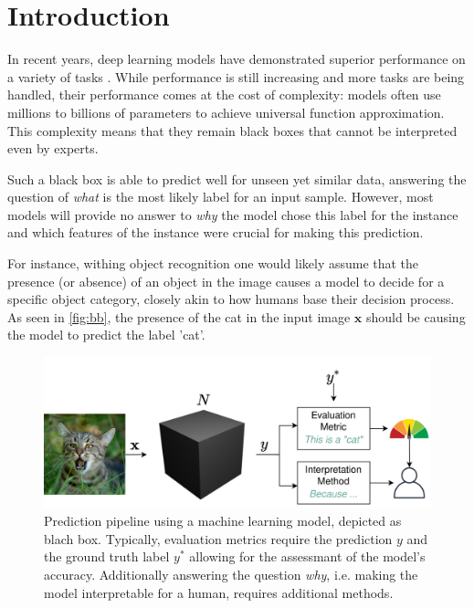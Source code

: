 \section{Introduction}
\label{sec:introduction}

In recent years, deep learning models have demonstrated superior performance on a variety of tasks \cite{ruede2020multi, brinker2019deep, nguyen2020super}. While performance is still increasing and more tasks are being handled, their performance comes at the cost of complexity: models often use millions to billions of parameters to achieve universal function approximation.
This complexity means that they remain black boxes that cannot be interpreted even by experts.

Such a black box is able to predict well for unseen yet similar data, answering the question of \textit{what} is the most likely label for an input sample. 
However, most models will provide no answer to \textit{why} the model chose this label for the instance and which features of the instance were crucial for making this prediction. 

For instance, withing object recognition one would likely assume that the presence (or absence) of an object in the image causes a model to decide for a specific object category, closely akin to how humans base their decision process. As seen in \autoref{fig:bb}, the presence of the cat in the input image $\mathbf{x}$ should be causing the model to predict the label 'cat'.  

\begin{figure}[t]
    \centering
    \includegraphics[width=\linewidth]{figures/bb_cat.png}
    \caption{Prediction pipeline using a machine learning model, depicted as blach box. Typically, evaluation metrics require the prediction $y$ and the ground truth label $y^*$ allowing for the assessmant of the model's accuracy. Additionally answering the question \textit{why}, i.e. making the model interpretable for a human, requires additional methods.}
    \label{fig:bb}
    \vspace{-0.3cm}
\end{figure}

